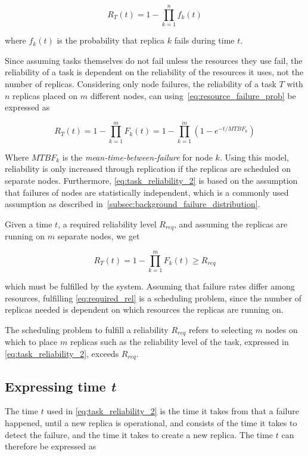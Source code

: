 \documentclass{cslthse-msc}
\begin{document}
\begin{equation} \label{eq:task_reliability}
R_{T}(t) = 1 - \prod\limits_{k=1}^n f_{k}(t)
\end{equation}

where $f_{k}(t)$ is the probability that replica $k$ fails during time $t$. 

Since assuming tasks themselves do not fail unless the resources they use fail, the reliability of a task is dependent on the reliability of the resources it uses, not the number of replicas. Considering only node failures, the reliability of a task $T$ with $n$ replicas placed on $m$ different nodes, can using~\cref{eq:resource_failure_prob} be expressed as

\begin{equation} \label{eq:task_reliability_2}
R_{T}(t) = 1 - \prod\limits_{k=1}^m F_{k}(t) = 1 - \prod\limits_{k=1}^m (1- e^{-t/MTBF_k})
\end{equation}

Where $MTBF_k$ is the \emph{mean-time-between-failure} for node $k$. Using this model, reliability is only increased through replication if the replicas are scheduled on separate nodes. Furthermore, \cref{eq:task_reliability_2} is based on the assumption that failures of nodes are statistically independent, which is a commonly used assumption as described in~\cref{subsec:background_failure_distribution}.

Given a time $t$, a required reliability level $R_{req}$, and assuming the replicas are running on $m$ separate nodes, we get

\begin{equation} \label{eq:required_rel}
R_T(t) = 1 - \prod\limits_{k=1}^m F_{k}(t) \geq R_{req}
\end{equation}

which must be fulfilled by the system. Assuming that failure rates differ among resources, fulfilling \cref{eq:required_rel} is a scheduling problem, since the number of replicas needed is dependent on which resources the replicas are running on.

The scheduling problem to fulfill a reliability $R_{req}$ refers to selecting $m$ nodes on which to place $m$ replicas such as the reliability level of the task, expressed in \cref{eq:task_reliability_2}, exceeds $R_{req}$.

\subsection{Expressing time \emph{t}} \label{sec:design_time_t}
The time $t$ used in \cref{eq:task_reliability_2} is the time it takes from that a failure happened, until a new replica is operational, and consists of the time it takes to detect the failure, and the time it takes to create a new replica. The time $t$ can therefore be expressed as 
\end{document}
